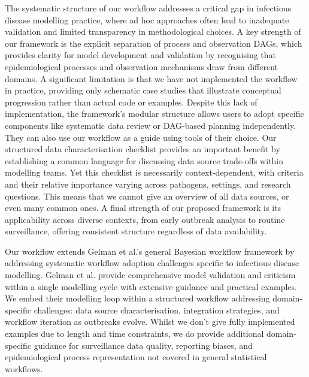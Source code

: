 \documentclass{article}
\begin{document}
The systematic structure of our workflow addresses a critical gap in infectious disease modelling practice, where ad hoc approaches often lead to inadequate validation and limited transparency in methodological choices.
A key strength of our framework is the explicit separation of process and observation DAGs, which provides clarity for model development and validation by recognising that epidemiological processes and observation mechanisms draw from different domains.
A significant limitation is that we have not implemented the workflow in practice, providing only schematic case studies that illustrate conceptual progression rather than actual code or examples.
Despite this lack of implementation, the framework's modular structure allows users to adopt specific components like systematic data review or DAG-based planning independently.
They can also use our workflow as a guide using tools of their choice.
Our structured data characterisation checklist provides an important benefit by establishing a common language for discussing data source trade-offs within modelling teams.
Yet this checklist is necessarily context-dependent, with criteria and their relative importance varying across pathogens, settings, and research questions.
This means that we cannot give an overview of all data sources, or even many common ones.
A final strength of our proposed framework is its applicability across diverse contexts, from early outbreak analysis to routine surveillance, offering consistent structure regardless of data availability.


Our workflow extends Gelman et al.'s general Bayesian workflow framework \citep{gelman2020bayesian} by addressing systematic workflow adoption challenges specific to infectious disease modelling.
Gelman et al. provide comprehensive model validation and criticism within a single modelling cycle with extensive guidance and practical examples.
We embed their modelling loop within a structured workflow addressing domain-specific challenges: data source characterisation, integration strategies, and workflow iteration as outbreaks evolve. 
Whilst we don't give fully implemented examples due to length and time constraints, we do provide additional domain-specific guidance for surveillance data quality, reporting biases, and epidemiological process representation not covered in general statistical workflows.
 
\end{document}
